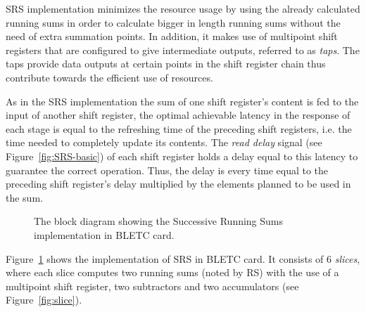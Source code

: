 \documentclass{llncs}
\begin{document}
SRS implementation minimizes the resource usage by using the already calculated running sums in order to calculate bigger in length running sums without the need of extra summation points. In addition, it makes use of multipoint shift registers that are configured to give intermediate outputs, referred to as \emph{taps}. The taps provide data outputs at certain points in the shift register chain thus contribute towards the efficient use of resources.

As in the SRS implementation the sum of one shift register's content is fed to the input of another shift register, the optimal achievable latency in the response of each stage is equal to the refreshing time of the preceding shift registers, i.e. the time needed to completely update its contents.  The \emph{read delay} signal (see Figure~\ref{fig:SRS-basic}) of each shift register holds a delay equal to this latency to guarantee the correct operation. Thus, the delay is every time equal to the preceding shift register's delay multiplied by the elements planned to be used in the sum.

\begin{figure}[t]
  \centering {}
   \caption{The block diagram showing the Successive Running Sums implementation in BLETC card.}
  \label{fig:srs}
\end{figure}


Figure~\ref{fig:srs} shows the implementation of SRS in BLETC card. It consists of 6 \emph{slices}, where each slice computes two running sums (noted by RS) with the use of a multipoint shift register, two subtractors and two accumulators (see Figure~\ref{fig:slice}).
\end{document}

